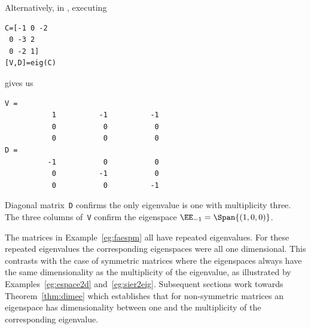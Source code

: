 \begin{example}
\begin{itemize}
\begin{solution}
Alternatively, in \script, executing 
\begin{verbatim}
C=[-1 0 -2
 0 -3 2
 0 -2 1]
[V,D]=eig(C)
\end{verbatim}
gives us
\begin{verbatim}
V =
           1          -1          -1
           0           0           0
           0           0           0
D =
          -1           0           0
           0          -1           0
           0           0          -1
\end{verbatim}
Diagonal matrix~\verb|D| confirms the only eigenvalue is one with multiplicity three.  
The three columns of~\verb|V| confirm the eigenspace \(\EE_{-1}=\Span\{(1,0,0)\}\).
\end{solution}

\end{itemize}
\end{example}

The matrices in Example~\ref{eg:faespm} all have repeated eigenvalues.  
For these repeated eigenvalues the corresponding eigenspaces were all one dimensional.
This contrasts with the case of symmetric matrices where the eigenspaces always have the same dimensionality as the multiplicity of the eigenvalue, as illustrated by Examples~\ref{eg:espace2d} and~\ref{eg:sier2eig}.
Subsequent sections work towards Theorem~\ref{thm:dimee} which establishes that for non-symmetric matrices an eigenspace has dimensionality between one and the multiplicity of the corresponding eigenvalue.


